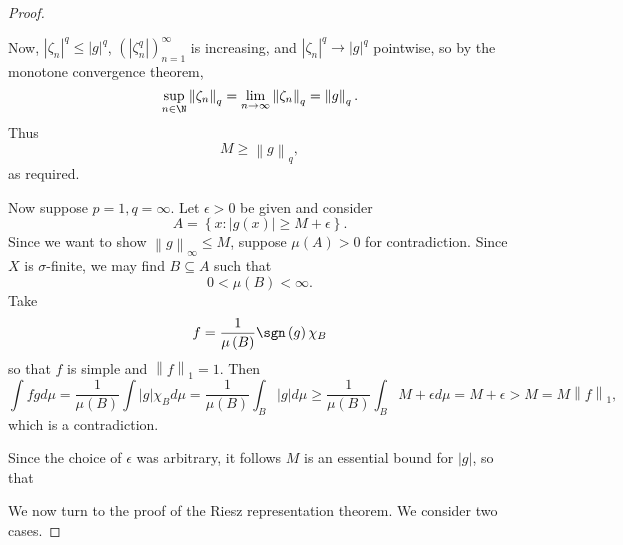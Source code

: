 \documentclass[pmath451]{subfiles}
\begin{document}
\begin{proof}
\begin{claim}
\begin{equation*}
            \end{equation*}
            Now, $\left| \zeta_n \right|^q\leq\left| g \right|^q$, $\left( \left| \zeta_n^q \right| \right)^{\infty}_{n=1}$ is increasing, and $\left| \zeta_n \right|^q\to\left| g \right|^q$ pointwise, so by the monotone convergence theorem,
            \begin{equation*}
                \sup_{n\in\N} \left\lVert \zeta_n\right\rVert_q = \lim_{n\to\infty} \left\lVert \zeta_n\right\rVert_q = \left\lVert g\right\rVert_q.
            \end{equation*}
            Thus
            \begin{equation*}
                M \geq \left\lVert g\right\rVert_q,
            \end{equation*}
            as required.

            Now suppose $p=1,q=\infty$. Let $\epsilon>0$ be given and consider
            \begin{equation*}
                A = \left\lbrace x:\left| g\left( x \right) \right|\geq M+\epsilon \right\rbrace.
            \end{equation*}
            Since we want to show $\left\lVert g \right\rVert_{\infty}\leq M$, suppose $\mu\left( A \right)>0$ for contradiction. Since $X$ is $\sigma$-finite, we may find $B\subseteq A$ such that
            \begin{equation*}
                0<\mu\left( B \right)<\infty.
            \end{equation*}
            Take
            \begin{equation*}
                f = \frac{1}{\mu\left( B \right)}\sgn\left( g \right)\chi_B
            \end{equation*}
            so that $f$ is simple and $\left\lVert f \right\rVert_{1} = 1$. Then
            \begin{equation*}
                \int fgd\mu = \frac{1}{\mu\left( B \right)} \int \left| g \right|\chi_Bd\mu = \frac{1}{\mu\left( B \right)} \int_B\left| g \right|d\mu \geq \frac{1}{\mu\left( B \right)} \int_B M+\epsilon d\mu = M+\epsilon > M = M \left\lVert f \right\rVert_{1},
            \end{equation*}
            which is a contradiction.

            Since the choice of $\epsilon$ was arbitrary, it follows $M$ is an essential bound for $\left| g \right|$, so that
        \end{claim}

        We now turn to the proof of the Riesz representation theorem. We consider two cases.


\end{proof}
\end{document}

